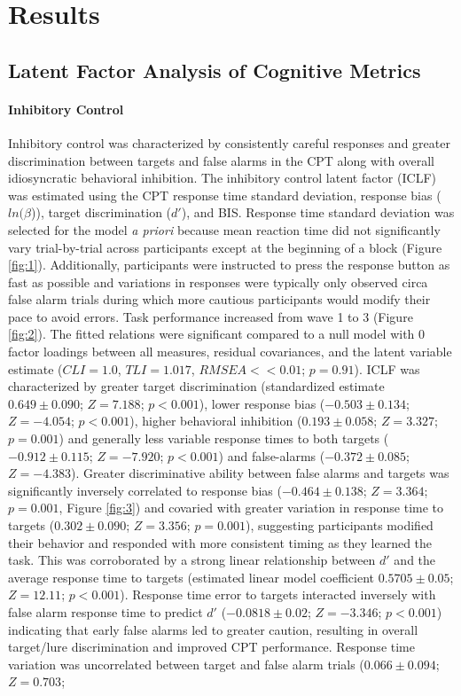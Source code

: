 \documentclass[utf8]{frontiersSCNS} %
\begin{document}
\section{Results} 
\subsection{Latent Factor Analysis of Cognitive Metrics} 
\paragraph{Inhibitory Control} Inhibitory control was characterized by consistently careful responses and greater discrimination between targets and false alarms in the CPT along with overall idiosyncratic behavioral inhibition. The inhibitory control latent factor (ICLF) was estimated using the CPT response time standard deviation, response bias ($ln(\beta$)), target discrimination ($d'$), and BIS. Response time standard deviation was selected for the model \textit{a priori} because mean reaction time did not significantly vary trial-by-trial across participants except at the beginning of a block (Figure \ref{fig:1}). Additionally, participants were instructed to press the response button as fast as possible and variations in responses were typically only observed circa false alarm trials during which more cautious participants would modify their pace to avoid errors. Task performance increased from wave 1 to 3 (Figure \ref{fig:2}). The fitted relations were significant compared to a null model with 0 factor loadings between all measures, residual covariances, and the latent variable estimate ($CLI = 1.0$, $TLI = 1.017$, $RMSEA << 0.01$; $p = 0.91$). ICLF was characterized by greater target discrimination (standardized estimate $0.649\pm0.090$; $Z = 7.188$; $p<0.001$), lower response bias ($-0.503\pm0.134$; $Z=-4.054$; $p<0.001$), higher behavioral inhibition ($0.193\pm0.058$; $Z=3.327$; $p=0.001$) and generally less variable response times to both targets ($-0.912\pm0.115$; $Z=-7.920$; $p<0.001$) and false-alarms ($-0.372\pm0.085$; $Z=-4.383$). Greater discriminative ability between false alarms and targets was significantly inversely correlated to response bias ($-0.464\pm0.138$; $Z=3.364$; $p=0.001$, Figure \ref{fig:3}) and covaried with greater variation in response time to targets ($0.302\pm0.090$; $Z=3.356$; $p=0.001$), suggesting participants modified their behavior and responded with more consistent timing as they learned the task. This was corroborated by a strong linear relationship between $d'$ and the average response time to targets (estimated linear model coefficient $0.5705\pm0.05$; $Z=12.11$; $p<0.001$). Response time error to targets interacted inversely with false alarm response time to predict $d'$ ($-0.0818\pm0.02$;  $Z=-3.346$; $p < 0.001$) indicating that early false alarms led to greater caution, resulting in overall target/lure discrimination and improved CPT performance. Response time variation was uncorrelated between target and false alarm trials ($0.066\pm0.094$; $Z=0.703$; 
\end{document}

